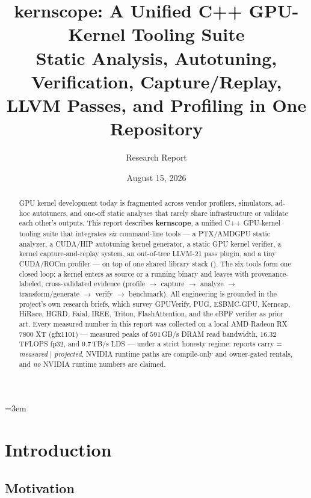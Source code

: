 \documentclass[10pt]{article}
\title{\vspace{-2.5em}\textbf{kernscope: A Unified C++ GPU-Kernel Tooling Suite}\\
\large Static Analysis, Autotuning, Verification, Capture/Replay, LLVM Passes, and Profiling in One Repository}
\author{Research Report}
\date{August 15, 2026}
\newcommand{\kst}[1]{\texttt{\detokenize{#1}}}
\begin{document}
\sloppy\emergencystretch=3em

\maketitle

\begin{abstract}
\noindent
GPU kernel development today is fragmented across vendor profilers, simulators, ad-hoc
autotuners, and one-off static analyses that rarely share infrastructure or validate each
other's outputs. This report describes \textbf{kernscope}, a unified C++ GPU-kernel tooling
suite that integrates \emph{six} command-line tools --- a PTX/AMDGPU static analyzer, a
CUDA/HIP autotuning kernel generator, a static GPU kernel verifier, a kernel
capture-and-replay system, an out-of-tree LLVM-21 pass plugin, and a tiny CUDA/ROCm
profiler --- on top of one shared library stack (\kst{libs/}). The six tools form one
closed loop: a kernel enters as source or a running binary and leaves with
provenance-labeled, cross-validated evidence (profile $\rightarrow$ capture $\rightarrow$
analyze $\rightarrow$ transform/generate $\rightarrow$ verify $\rightarrow$ benchmark).
All engineering is grounded in the project's own research briefs, which survey GPUVerify,
PUG, ESBMC-GPU, Kerncap, HiRace, HGRD, Faial, IREE, Triton, FlashAttention, and the eBPF
verifier as prior art. Every measured number in this report was collected on a local AMD
Radeon RX 7800 XT (gfx1101) --- measured peaks of $591$\,GB/s DRAM read bandwidth,
$16.32$\,TFLOPS fp32, and $9.7$\,TB/s LDS --- under a strict honesty regime: reports carry
\kst{provenance.mode} = \emph{measured} $|$ \emph{projected}, NVIDIA runtime paths are
compile-only and owner-gated rentals, and \emph{no} NVIDIA runtime numbers are claimed.
\end{abstract}

\tableofcontents
\newpage

\section{Introduction}

\subsection{Motivation}
\end{document}

